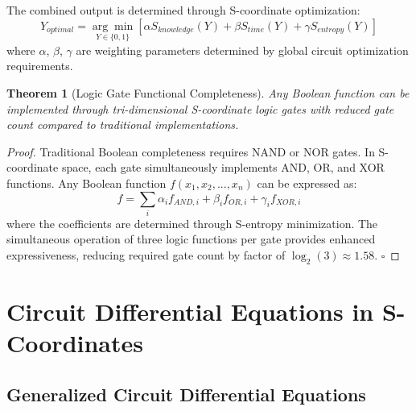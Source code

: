 \documentclass[12pt,a4paper]{article}
\newtheorem{theorem}{Theorem}
\begin{document}
The combined output is determined through S-coordinate optimization:
\begin{equation}
Y_{optimal} = \underset{Y \in \{0,1\}}{\arg\min} \left[ \alpha S_{knowledge}(Y) + \beta S_{time}(Y) + \gamma S_{entropy}(Y) \right]
\end{equation}
where $\alpha$, $\beta$, $\gamma$ are weighting parameters determined by global circuit optimization requirements.

\begin{theorem}[Logic Gate Functional Completeness]
Any Boolean function can be implemented through tri-dimensional S-coordinate logic gates with reduced gate count compared to traditional implementations.
\end{theorem}

\begin{proof}
Traditional Boolean completeness requires NAND or NOR gates. In S-coordinate space, each gate simultaneously implements AND, OR, and XOR functions. Any Boolean function $f(x_1, x_2, ..., x_n)$ can be expressed as:
\begin{equation}
f = \sum_{i} \alpha_i f_{AND,i} + \beta_i f_{OR,i} + \gamma_i f_{XOR,i}
\end{equation}
where the coefficients are determined through S-entropy minimization. The simultaneous operation of three logic functions per gate provides enhanced expressiveness, reducing required gate count by factor of $\log_2(3) \approx 1.58$. $\square$
\end{proof}

\section{Circuit Differential Equations in S-Coordinates}

\subsection{Generalized Circuit Differential Equations}
\end{document}
